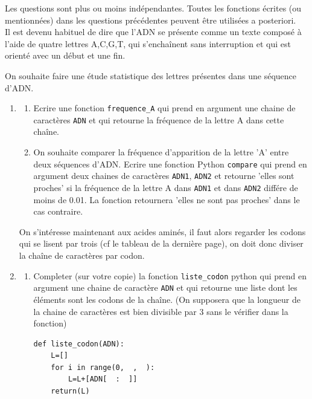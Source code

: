


\begin{exercice}[Informatique]
Les questions sont plus ou moins indépendantes. Toutes les fonctions écrites (ou mentionnées) dans les questions précédentes peuvent être utilisées a posteriori. \\


Il est devenu habituel de dire que l'ADN se présente comme un texte composé à l'aide de quatre lettres A,C,G,T, qui s'enchaînent sans interruption et qui est orienté avec un début et une fin. 


On souhaite faire une étude statistique des lettres présentes dans une séquence d'ADN. 
\begin{enumerate}
\item \begin{enumerate}


\item Ecrire une fonction \texttt{frequence\_A} qui prend en argument une chaine de caractères \texttt{ADN}  et qui retourne la fréquence de la lettre A dans cette chaîne. 

\item On souhaite comparer la fréquence d'apparition de la lettre 'A' entre deux séquences d'ADN. Ecrire une fonction Python \texttt{compare} qui prend en argument deux chaines de caractères \texttt{ADN1}, \texttt{ADN2} et retourne 'elles sont proches' si la fréquence de la lettre A dans \texttt{ADN1} et dans \texttt{ADN2} différe de moins de 0.01. La fonction retournera 'elles ne sont pas proches' dans le cas contraire. \\
\end{enumerate}

On s'intéresse maintenant aux acides aminés, il faut alors regarder les codons qui se lisent par trois (cf le tableau de la dernière page), on doit donc diviser la chaîne de caractères par codon. 

\item
\begin{enumerate}
\item Completer (sur votre copie) la fonction \texttt{liste\_codon}  python qui prend en argument une chaine de caractère \texttt{ADN} et qui  retourne une liste dont les éléments sont les codons de la chaîne. (On supposera que la longueur de la chaine de caractères est bien divisible par 3 sans le vérifier dans la fonction) 
\begin{lstlisting}
def liste_codon(ADN):
    L=[]
    for i in range(0,  ,  ):
        L=L+[ADN[  :  ]]
    return(L)
\end{lstlisting}


\end{enumerate}
\end{enumerate}
\end{exercice}
